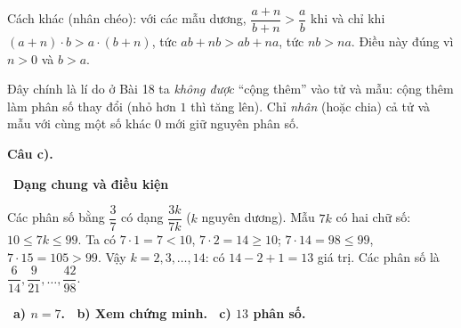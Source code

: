 \documentclass[11pt]{article}
\providecommand{\AnsWord}{Đáp số}
\newcommand{\ans}[1]{\par\smallskip{\bfseries\color{tmGreen!88!black}\AnsWord:}\ {\bfseries\color{AnsRed}#1}\par}
\newcommand{\step}[2]{\par\smallskip\noindent{\bfseries\color{tmBlue!85!black}\StepWord~#1.}\ {\bfseries #2}\par\nopagebreak}
\def\AnsWord{Đáp số}
\def\StepWord{Bước}
\begin{document}
{\begin{proofbox}Cách khác (nhân chéo): với các mẫu dương, $\dfrac{a+n}{b+n}>\dfrac ab$ khi và chỉ khi $(a+n)\cdot b>a\cdot(b+n)$, tức $ab+nb>ab+na$, tức $nb>na$. Điều này đúng vì $n>0$ và $b>a$.\end{proofbox}

\begin{warnbox}Đây chính là lí do ở Bài 18 ta \emph{không được} ``cộng thêm'' vào tử và mẫu: cộng thêm làm phân số thay đổi (nhỏ hơn $1$ thì tăng lên). Chỉ \emph{nhân} (hoặc chia) cả tử và mẫu với cùng một số khác $0$ mới giữ nguyên phân số.\end{warnbox}

\par\smallskip\textbf{Câu c).}
\step{6}{Dạng chung và điều kiện}
Các phân số bằng $\dfrac37$ có dạng $\dfrac{3k}{7k}$ ($k$ nguyên dương). Mẫu $7k$ có hai chữ số: $10\le 7k\le 99$. Ta có $7\cdot 1=7<10$, $7\cdot 2=14\ge 10$; $7\cdot 14=98\le 99$, $7\cdot 15=105>99$. Vậy $k=2,3,\dots,14$: có $14-2+1=13$ giá trị.
Các phân số là $\dfrac{6}{14},\dfrac{9}{21},\dots,\dfrac{42}{98}$.

\ans{a) $n=7$. \ b) Xem chứng minh. \ c) $13$ phân số.}
}
\end{document}
